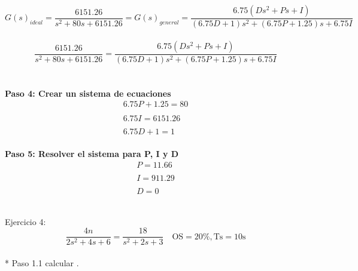 \documentclass[12pt,letterpaper]{article}
\begin{document}
\begin{equation}G(s)_{ideal}=\frac{6151.26}{s^{2}+80s+6151.26} = G(s)_{general} = \frac{6.75(Ds^{2}+Ps+I)}{(6.75D+1)s^{2}+(6.75P+1.25)s+6.75I} \end{equation} \\ 

\begin{equation} 
\frac{6151.26}{s^{2}+80s+6151.26} =  \frac{6.75(Ds^{2}+Ps+I)}{(6.75D+1)s^{2}+(6.75P+1.25)s+6.75I}
\end{equation} \\ \\ 



\textbf{Paso 4: Crear un sistema de ecuaciones } \\ 

\begin{equation}\begin{array}{l}
6.75P+1.25=80 \\ \\ 
6.75I=6151.26  \\ \\ 
6.75D+1=1 
\end{array}\end{equation} \\ 


\textbf{Paso 5: Resolver el sistema para P, I y D } \\ 

\begin{equation}\begin{array}{l}
P=11.66\\ \\ 
I=911.29\\ \\ 
D=0
\end{array}\end{equation} \\ 
 


\setcounter{equation}{0} %


Ejercicio 4: \\ 

\begin{equation}\frac{4n}{2s^{2}+4s+6} = \frac{18}{s^{2}+2s+3} \quad \mathrm{OS}=20 \%, \mathrm{Ts}=10 \mathrm{s}\end{equation} \\ 

* Paso 1.1 calcular \zeta.
\end{document}
